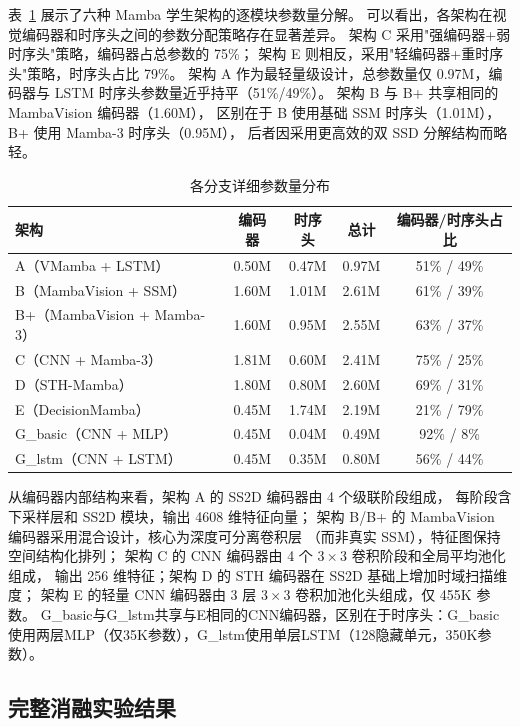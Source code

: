 \documentclass[12pt,a4paper]{article}
\numberwithin{equation}{section}
\numberwithin{figure}{section}
\numberwithin{table}{section}
\begin{document}
表~\ref{tab:app_params} 展示了六种 Mamba 学生架构的逐模块参数量分解。
可以看出，各架构在视觉编码器和时序头之间的参数分配策略存在显著差异。
架构 C 采用"强编码器+弱时序头"策略，编码器占总参数的 75\%；
架构 E 则相反，采用"轻编码器+重时序头"策略，时序头占比 79\%。
架构 A 作为最轻量级设计，总参数量仅 0.97M，编码器与 LSTM 时序头参数量近乎持平（51\%/49\%）。
架构 B 与 B+ 共享相同的 MambaVision 编码器（1.60M），
区别在于 B 使用基础 SSM 时序头（1.01M），B+ 使用 Mamba-3 时序头（0.95M），
后者因采用更高效的双 SSD 分解结构而略轻。

\begin{table}[H]
\centering
\caption{各分支详细参数量分布}
\label{tab:app_params}
\begin{tabular}{lcccc}
\toprule
\textbf{架构} & \textbf{编码器} & \textbf{时序头} & \textbf{总计} & \textbf{编码器/时序头占比} \\
\midrule
A（VMamba + LSTM） & 0.50M & 0.47M & 0.97M & 51\% / 49\% \\
B（MambaVision + SSM） & 1.60M & 1.01M & 2.61M & 61\% / 39\% \\
B+（MambaVision + Mamba-3） & 1.60M & 0.95M & 2.55M & 63\% / 37\% \\
C（CNN + Mamba-3） & 1.81M & 0.60M & 2.41M & 75\% / 25\% \\
D（STH-Mamba） & 1.80M & 0.80M & 2.60M & 69\% / 31\% \\
E（DecisionMamba） & 0.45M & 1.74M & 2.19M & 21\% / 79\% \\
G\_basic（CNN + MLP） & 0.45M & 0.04M & 0.49M & 92\% / 8\% \\
G\_lstm（CNN + LSTM） & 0.45M & 0.35M & 0.80M & 56\% / 44\% \\
\bottomrule
\end{tabular}
\end{table}

\noindent 从编码器内部结构来看，架构 A 的 SS2D 编码器由 4 个级联阶段组成，
每阶段含下采样层和 SS2D 模块，输出 4608 维特征向量；
架构 B/B+ 的 MambaVision 编码器采用混合设计，核心为深度可分离卷积层
（而非真实 SSM），特征图保持空间结构化排列；
架构 C 的 CNN 编码器由 4 个 $3\times3$ 卷积阶段和全局平均池化组成，
输出 256 维特征；架构 D 的 STH 编码器在 SS2D 基础上增加时域扫描维度；
架构 E 的轻量 CNN 编码器由 3 层 $3\times3$ 卷积加池化头组成，仅 455K 参数。
G\_basic与G\_lstm共享与E相同的CNN编码器，区别在于时序头：G\_basic使用两层MLP（仅35K参数），G\_lstm使用单层LSTM（128隐藏单元，350K参数）。

\subsection{完整消融实验结果}
\label{app:ablation}
\end{document}
